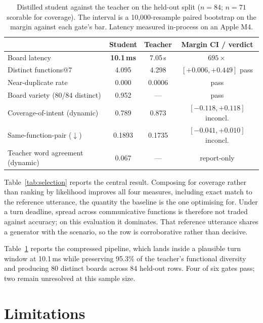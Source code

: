 \begin{table}[t]
\centering
\small
\caption{Distilled student against the teacher on the held-out split ($n{=}84$;
$n{=}71$ scorable for coverage). The interval is a 10{,}000-resample paired
bootstrap on the margin against each gate's bar. Latency measured in-process on
an Apple M4.}
\label{tab:student}
\begin{tabular}{lccc}
\toprule
 & \textbf{Student} & \textbf{Teacher} & \textbf{Margin CI / verdict} \\
\midrule
Board latency                       & \textbf{10.1\,ms} & 7.05\,s & $695\times$ \\
Distinct functions@7                & 4.095 & 4.298 & $[+0.006, +0.449]$ pass \\
Near-duplicate rate                 & 0.000 & 0.0006 & pass \\
Board variety (80/84 distinct)      & 0.952 & --- & pass \\
Coverage-of-intent (dynamic)        & 0.789 & 0.873 & $[-0.118, +0.118]$ inconcl. \\
Same-function-pair ($\downarrow$)   & 0.1893 & 0.1735 & $[-0.041, +0.010]$ inconcl. \\
Teacher word agreement (dynamic)    & 0.067 & --- & report-only \\
\bottomrule
\end{tabular}
\end{table}

Table~\ref{tab:selection} reports the central result. Composing for coverage
rather than ranking by likelihood improves all four measures, including exact
match to the reference utterance, the quantity the baseline is the one optimising
for. Under a turn deadline, spread across communicative functions is therefore
not traded against accuracy; on this evaluation it dominates. That reference
utterance shares a generator with the scenario, so the row is corroborative
rather than decisive.

Table~\ref{tab:student} reports the compressed pipeline, which lands inside a
plausible turn window at 10.1\,ms while preserving 95.3\% of the teacher's
functional diversity and producing 80 distinct boards across 84 held-out rows.
Four of six gates pass; two remain unresolved at this sample size.

\section{Limitations}\label{sec:limits}

